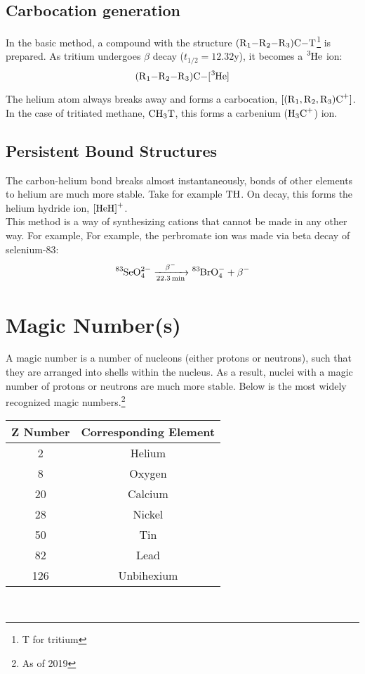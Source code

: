 \documentclass{article}
\begin{document}
\begin{multicols*}{2}
    \subsection{Carbocation generation}
    In the basic method, a compound with the structure $\ce{(R1-R2-R3)C-T}$\footnote{T for tritium}
    is prepared. As tritium undergoes $\beta$ decay ($t_{1/2} = 12.32$y), it becomes
    a $\ce{^{3}He}$ ion:
    \[
      \ce{(R1-R2-R3)C-[^{3}He]}
    \]

    The helium atom always breaks away and forms a carbocation, $\ce{[(R1,R2,R3)C+]}$.
    In the case of tritiated methane, $\ce{CH3T}$, this forms a carbenium ($\ce{H3C+}$) ion.

    \subsection{Persistent Bound Structures}
    The carbon-helium bond breaks almost instantaneously, bonds of other elements to helium
    are much more stable. Take for example $\ce{TH}$. On decay, this forms the
    helium hydride ion, $\ce{[HeH]+}$.\\

    This method is a way of synthesizing cations that cannot be made in any other way. For example,
    For example, the perbromate ion was made via beta decay of selenium-83:
    \[
      \ce{^{83}SeO^{2-}_{4} ->[\beta-][22.3min] ^{83}BrO^-_4 + \beta-}
    \]

    \section{Magic Number(s)}
    A magic number is a number of nucleons (either protons or neutrons), such that they
    are arranged into shells within the nucleus. As a result, nuclei with a magic number of
    protons or neutrons are much more stable. Below is the most widely recognized magic numbers.\footnote{As of 2019}
    
    \begin{tabular}{|c|c|}
      \hline
      \textbf{Z Number} & \textbf{Corresponding Element} \\
      \hline
      2   & Helium  \\
      8   & Oxygen  \\
      20  & Calcium \\
      28  & Nickel  \\
      50  & Tin     \\
      82  & Lead    \\
      126 & Unbihexium \\
      \hline
    \end{tabular}\\



\end{multicols*}
\end{document}
